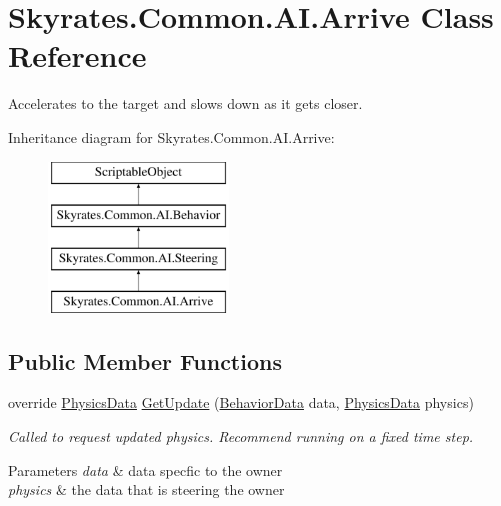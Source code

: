 \hypertarget{class_skyrates_1_1_common_1_1_a_i_1_1_arrive}{\section{Skyrates.\-Common.\-A\-I.\-Arrive Class Reference}
\label{class_skyrates_1_1_common_1_1_a_i_1_1_arrive}
}


Accelerates to the target and slows down as it gets closer.  


Inheritance diagram for Skyrates.\-Common.\-A\-I.\-Arrive\-:\begin{figure}[H]
\begin{center}
\leavevmode
\includegraphics[height=4.000000cm]{class_skyrates_1_1_common_1_1_a_i_1_1_arrive}
\end{center}
\end{figure}
\subsection*{Public Member Functions}
\begin{DoxyCompactItemize}
\item 
\hypertarget{class_skyrates_1_1_common_1_1_a_i_1_1_arrive_a535360b8f486e9caac870c184a5470b8}{override \hyperlink{class_skyrates_1_1_common_1_1_a_i_1_1_physics_data}{Physics\-Data} \hyperlink{class_skyrates_1_1_common_1_1_a_i_1_1_arrive_a535360b8f486e9caac870c184a5470b8}{Get\-Update} (\hyperlink{class_skyrates_1_1_common_1_1_a_i_1_1_behavior_data}{Behavior\-Data} data, \hyperlink{class_skyrates_1_1_common_1_1_a_i_1_1_physics_data}{Physics\-Data} physics)}\label{class_skyrates_1_1_common_1_1_a_i_1_1_arrive_a535360b8f486e9caac870c184a5470b8}

\begin{DoxyCompactList}\small\item\em Called to request updated physics. Recommend running on a fixed time step. 


\begin{DoxyParams}{Parameters}
{\em data} & data specfic to the owner\\
\hline
{\em physics} & the data that is steering the owner\\
\hline
\end{DoxyParams}
 \end{DoxyCompactList}\end{DoxyCompactItemize}
